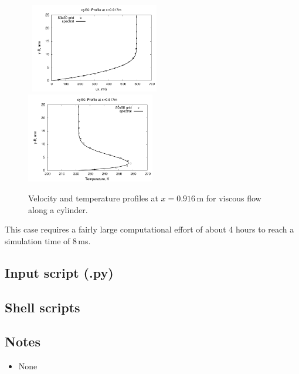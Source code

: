 \begin{figure}[htbp]
\mbox{
\includegraphics[width=0.5\textwidth]{../2D/axi-cylinder/cyl50_profile_ux.pdf}
\includegraphics[width=0.5\textwidth]{../2D/axi-cylinder/cyl50_profile_T.pdf}
}
\caption{Velocity and temperature profiles at $x = 0.916$\,m for viscous flow along a cylinder.}
   \label{cyl50-profiles-fig}
\end{figure}

\medskip
This case requires a fairly large computational effort of about 4 hours to reach
a simulation time of 8\,ms.


\newpage
\subsection{Input script (.py)}
\topbar

\bottombar


\subsection{Shell scripts}
\label{axi-cylinder-sh-files}
\topbar

\bottombar

\noindent
\topbar

\bottombar


\subsection{Notes}
\begin{itemize}
\item None
\end{itemize}


